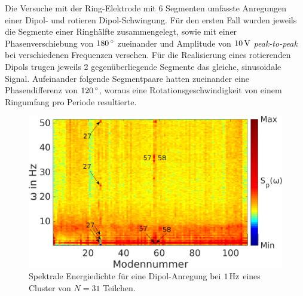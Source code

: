 \documentclass[numbers=noenddot,a4paper,notitlepage,twoside,BCOR15mm]{scrbook}
\newcommand{\degree}{^\circ}
\newcommand{\tilt}[1]{\textit{#1}}
\begin{document}
					Die Versuche mit der Ring-Elektrode mit 6 Segmenten umfasste Anregungen einer Dipol- und rotieren Dipol-Schwingung. Für den ersten Fall wurden jeweils die Segmente einer Ringhälfte zusammengelegt, sowie mit einer Phasenverschiebung von $\unit[180]{\degree}$ zueinander und Amplitude von $\unit[10]{V}$ \tilt{peak-to-peak} bei verschiedenen Frequenzen versehen. Für die Realisierung eines rotierenden Dipols trugen jeweils 2 gegenüberliegende Segmente das gleiche, sinusoidale Signal. Aufeinander folgende Segmentpaare hatten zueinander eine Phasendifferenz von $\unit[120]{\degree}$, woraus eine Rotationsgeschwindigkeit von einem Ringumfang pro Periode resultierte.

						\begin{figure}[!b]
							\centering
							\includegraphics[width=\textwidth,height=0.5\textwidth]{figs/auswertung/manipulation/dipol1Hzpowerdens.png}
							\caption{Spektrale Energiedichte für eine Dipol-Anregung  bei $\unit[1]{Hz}$ eines Cluster von $N=31$ Teilchen.}\label{img:powerdensdipol1Hz}
						\end{figure}

\end{document}
